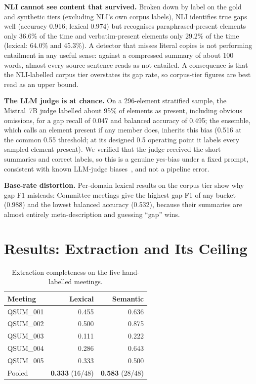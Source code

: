 \documentclass[conference]{IEEEtran}
\begin{document}
\textbf{NLI cannot see content that survived.} Broken down by label on the
gold and synthetic tiers (excluding NLI's own corpus labels), NLI identifies
true gaps well (accuracy 0.916; lexical 0.974) but recognises paraphrased-present
elements only 36.6\% of the time and verbatim-present elements only 29.2\% of
the time (lexical: 64.0\% and 45.3\%). A detector that misses literal copies is not
performing entailment in any useful sense: against a compressed summary of about
100 words, almost every source sentence reads as not entailed. A consequence is
that the NLI-labelled corpus tier overstates its gap rate, so corpus-tier
figures are best read as an upper bound.

\textbf{The LLM judge is at chance.} On a 296-element stratified sample, the
Mistral~7B judge labelled about 95\% of elements as present, including obvious
omissions, for a gap recall of 0.047 and balanced accuracy of 0.495; the ensemble,
which calls an element present if any member does, inherits this bias (0.516 at
the common 0.55 threshold; at its designed 0.5 operating point it labels every
sampled element present). We verified
that the judge received the short summaries and correct labels, so this is a
genuine yes-bias under a fixed prompt, consistent with known LLM-judge
biases~\cite{zheng2023judging}, and not a pipeline error.

\textbf{Base-rate distortion.} Per-domain lexical results on the corpus tier show
why gap F1 misleads: Committee meetings give the highest gap F1 of any bucket
(0.988) and the lowest balanced accuracy (0.532), because their summaries are
almost entirely meta-description and guessing ``gap'' wins.

\section{Results: Extraction and Its Ceiling}

\begin{table}[t]
\caption{Extraction completeness on the five hand-labelled meetings.}
\label{tab:complete}
\centering
\small
\begin{tabular}{@{}lrr@{}}
\toprule
Meeting & Lexical & Semantic \\
\midrule
QSUM\_001 & 0.455 & 0.636 \\
QSUM\_002 & 0.500 & 0.875 \\
QSUM\_003 & 0.111 & 0.222 \\
QSUM\_004 & 0.286 & 0.643 \\
QSUM\_005 & 0.333 & 0.500 \\
\midrule
Pooled & \textbf{0.333} (16/48) & \textbf{0.583} (28/48) \\
\bottomrule
\end{tabular}
\end{table}
\end{document}
